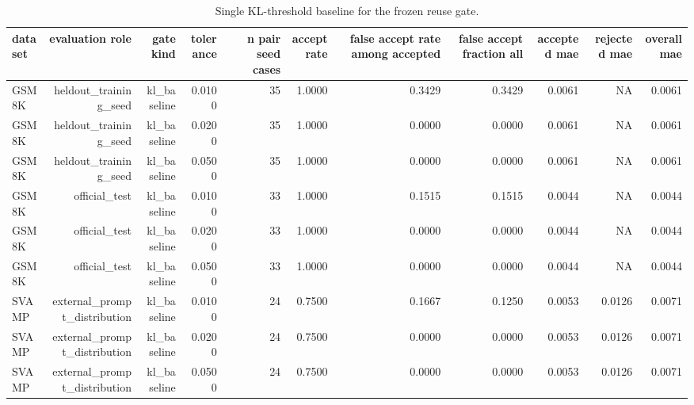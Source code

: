 \begin{table}[t]
\centering
\small
\caption{Single KL-threshold baseline for the frozen reuse gate.}
\label{tab:gate\_baseline}
\begin{tabular}{lrrrrrrrrrr}
\toprule
dataset & evaluation role & gate kind & tolerance & n pair seed cases & accept rate & false accept rate among accepted & false accept fraction all & accepted mae & rejected mae & overall mae \\
\midrule
GSM8K & heldout\_training\_seed & kl\_baseline & 0.0100 & 35 & 1.0000 & 0.3429 & 0.3429 & 0.0061 & NA & 0.0061 \\
GSM8K & heldout\_training\_seed & kl\_baseline & 0.0200 & 35 & 1.0000 & 0.0000 & 0.0000 & 0.0061 & NA & 0.0061 \\
GSM8K & heldout\_training\_seed & kl\_baseline & 0.0500 & 35 & 1.0000 & 0.0000 & 0.0000 & 0.0061 & NA & 0.0061 \\
GSM8K & official\_test & kl\_baseline & 0.0100 & 33 & 1.0000 & 0.1515 & 0.1515 & 0.0044 & NA & 0.0044 \\
GSM8K & official\_test & kl\_baseline & 0.0200 & 33 & 1.0000 & 0.0000 & 0.0000 & 0.0044 & NA & 0.0044 \\
GSM8K & official\_test & kl\_baseline & 0.0500 & 33 & 1.0000 & 0.0000 & 0.0000 & 0.0044 & NA & 0.0044 \\
SVAMP & external\_prompt\_distribution & kl\_baseline & 0.0100 & 24 & 0.7500 & 0.1667 & 0.1250 & 0.0053 & 0.0126 & 0.0071 \\
SVAMP & external\_prompt\_distribution & kl\_baseline & 0.0200 & 24 & 0.7500 & 0.0000 & 0.0000 & 0.0053 & 0.0126 & 0.0071 \\
SVAMP & external\_prompt\_distribution & kl\_baseline & 0.0500 & 24 & 0.7500 & 0.0000 & 0.0000 & 0.0053 & 0.0126 & 0.0071 \\
\bottomrule
\end{tabular}
\end{table}
